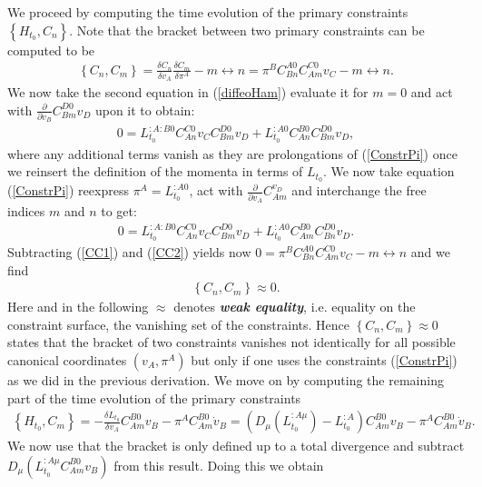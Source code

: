 \documentclass[a4paper,12pt, DIV=14, BCOR=5mm, twoside, headsepline]{scrbook}
\begin{document}
We proceed by computing the time evolution of the primary constraints $\left \{ H_{t_0}, C_n \right \}$. Note that the bracket between two primary constraints can be computed to be 
\begin{align}
    \left \{C_n, C_m \right \} = \frac{\delta C_n}{\delta v_A}\frac{\delta C_m}{\delta \pi^A} - m \leftrightarrow n = \pi^B C_{Bn}^{A0}C_{Am}^{C0} v_C - m \leftrightarrow n .
\end{align}
We now take the second equation in (\ref{diffeoHam}) evaluate it for $m=0$ and act with $\frac{\partial}{\partial \dot{v}_B}C_{Bm}^{D0}v_D$ upon it to obtain: 
\begin{align}\label{CC1}
    0 = L_{t_0}^{:A:B0}C_{An}^{C0}v_CC_{Bm}^{D0}v_D + L_{t_0}^{:A0}C_{An}^{B0}C_{Bm}^{D0}v_D,
\end{align}
where any additional terms vanish as they are prolongations of (\ref{ConstrPi}) once we reinsert the definition of the momenta in terms of $L_{t_0}$. We now take equation (\ref{ConstrPi}) reexpress $\pi^A = L_{t_0}^{:A0}$, act with $\frac{\partial}{\partial v_A}C_{Am}^{v_D}$ and interchange the free indices $m$ and $n$ to get:
\begin{align}\label{CC2}
    0 = L_{t_0}^{:A:B0}C_{An}^{C0}v_CC_{Bm}^{D0}v_D + L_{t_0}^{:A0}C_{Am}^{B0}C_{Bn}^{D0}v_D.
\end{align}
Subtracting (\ref{CC1}) and (\ref{CC2}) yields now $0=\pi^B C_{Bn}^{A0}C_{Am}^{C0} v_C - m \leftrightarrow n$ and we find
\begin{align}
    \left \{C_n, C_m \right \} \approx 0.
\end{align}
Here and in the following $\approx$ denotes \textit{\textbf{weak equality}}, i.e. equality on the constraint surface, the vanishing set of the constraints. Hence $\left \{C_n, C_m \right \} \approx 0$ states that the bracket of two constraints vanishes not identically for all possible canonical coordinates $(v_A,\pi^A)$ but only if one uses the constraints (\ref{ConstrPi}) as we did in the previous derivation. We move on by computing the remaining part of the time evolution of the primary constraints
\begin{align}
    \left \{H_{t_0}, C_m \right \} = -\frac{\delta L_{t_0}}{\delta v_A}C_{Am}^{B0}v_B - \pi^A C_{Am}^{B0}\dot{v}_B = (D_{\mu}(L_{t_0}^{:A\mu}) - L_{t_0}^{:A}) C_{Am}^{B0}v_B - \pi^A C_{Am}^{B0}\dot{v}_B.
\end{align}
We now use that the bracket is only defined up to a total divergence and subtract $D_{\mu}(L_{t_0}^{:A\mu} C_{Am}^{B0}v_B)$ from this result. Doing this we obtain
\end{document}
